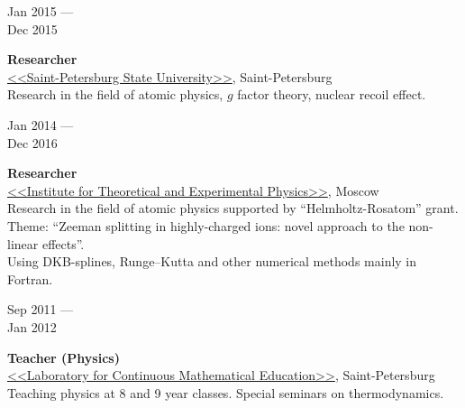 \documentclass[10pt,a4paper]{article}
\newcommand{\lmpratio}{0.15}
\newcommand{\rmpratio}{0.74}
\newcommand{\verticalSpace}{0.3cm}
\newcommand{\vSpace}{0.5cm}
\newcommand{\horizontalSpace}{0.05\textwidth}
\newcommand{\sectionMain}[1]{\textbf{#1}}
\begin{document}
	\begin{minipage}[t]{\lmpratio\textwidth}
		Jan 2015 --- \\Dec 2015
	\end{minipage}
	\hspace{\horizontalSpace}
	\begin{minipage}[t]{\rmpratio\textwidth}
		\sectionMain{Researcher}\\
		\href{http://english.spbu.ru/}{<<Saint-Petersburg State University>>}, Saint-Petersburg\\[0.5cm]		
		Research in the field of atomic physics, $g$ factor theory, nuclear recoil effect. \\

	\end{minipage}
	\vspace{\vSpace}

	\begin{minipage}[t]{\lmpratio\textwidth}
		Jan 2014 --- \\Dec 2016
	\end{minipage}
	\hspace{\horizontalSpace}
	\begin{minipage}[t]{\rmpratio\textwidth}
		\sectionMain{Researcher}\\
		\href{http://frrc.itep.ru/index.php/en/}{<<Institute for Theoretical and Experimental Physics>>}, Moscow\\[0.5cm]
		Research in the field of atomic physics supported by ``Helmholtz-Rosatom'' grant. 
		Theme: ``Zeeman splitting in highly-charged ions: novel approach to the non-linear effects''. \\[0.5cm]

        Using DKB-splines, Runge–Kutta and other numerical methods mainly in Fortran.
  
	\end{minipage}
	
	\vspace{\vSpace}

	
	
	\begin{minipage}[t]{\lmpratio\textwidth}
		Sep 2011 --- \\Jan 2012
	\end{minipage}
	\hspace{\horizontalSpace}
	\begin{minipage}[t]{\rmpratio\textwidth}
		\sectionMain{Teacher (Physics)}\\
		\href{http://lnmo.ru/}{<<Laboratory for Continuous Mathematical Education>>}, Saint-Petersburg\\[0.5cm]
		Teaching physics at 8 and 9 year classes. Special seminars on thermodynamics.
	\end{minipage}	
	\vspace{\verticalSpace}
	\vspace{\verticalSpace}
\end{document}
